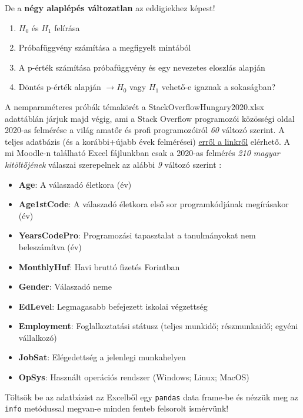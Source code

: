 \documentclass[
]{book}
\providecommand{\tightlist}{%
  \setlength{\itemsep}{0pt}\setlength{\parskip}{0pt}}
\begin{document}
De a \textbf{négy alaplépés változatlan} az eddigiekhez képest!

\begin{enumerate}
\def\labelenumi{\arabic{enumi}.}
\tightlist
\item
  \(H_0\) és \(H_1\) felírása
\item
  Próbafüggvény számítása a megfigyelt mintából
\item
  A p-érték számítása próbafüggvény és egy nevezetes eloszlás alapján
\item
  Döntés p-érték alapján \(\rightarrow H_0\) vagy \(H_1\) vehető-e igaznak a sokaságban?
\end{enumerate}

A nemparaméteres próbák témakörét a StackOverflowHungary2020.xlsx adattáblán járjuk majd végig, ami a Stack Overflow programozói közösségi oldal 2020-as felmérése a világ amatőr és profi programozóiról \emph{60} változó szerint. A teljes adatbázis (és a korábbi+újabb évek felmérései) \href{https://insights.stackoverflow.com/survey}{erről a linkről} elérhető.
A mi Moodle-n található Excel fájlunkban csak a 2020-as felmérés \emph{210 magyar kitöltőjének} válaszai szerepelnek az alábbi \emph{9} változó szerint :

\begin{itemize}
\tightlist
\item
  \textbf{Age}: A válaszadó életkora (év)
\item
  \textbf{Age1stCode}: A válaszadó életkora első sor programkódjának megírásakor (év)
\item
  \textbf{YearsCodePro}: Programozási tapasztalat a tanulmányokat nem beleszámítva (év)
\item
  \textbf{MonthlyHuf}: Havi bruttó fizetés Forintban
\item
  \textbf{Gender}: Válaszadó neme
\item
  \textbf{EdLevel}: Legmagasabb befejezett iskolai végzettség
\item
  \textbf{Employment}: Foglalkoztatási státusz (teljes munkidő; részmunkaidő; egyéni vállalkozó)
\item
  \textbf{JobSat}: Elégedettség a jelenlegi munkahelyen
\item
  \textbf{OpSys}: Használt operációs rendszer (Windows; Linux; MacOS)
\end{itemize}

Töltsök be az adatbázist az Excelből egy \texttt{pandas} data frame-be és nézzük meg az \texttt{info} metódussal megvan-e minden fenteb felsorolt ismérvünk!
\end{document}
